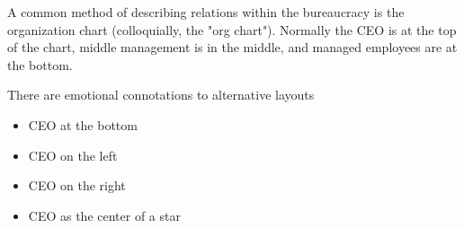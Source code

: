 \label{org-chart-orientation}
A common method of describing relations within the bureaucracy is the organization chart (colloquially, the "org chart"). Normally the CEO is at the top of the chart, middle management is in the middle, and managed employees are at the bottom. 

There are emotional connotations to alternative layouts
\begin{itemize}
\item CEO at the bottom
\item CEO on the left
\item CEO on the right
\item CEO as the center of a star
\end{itemize}



